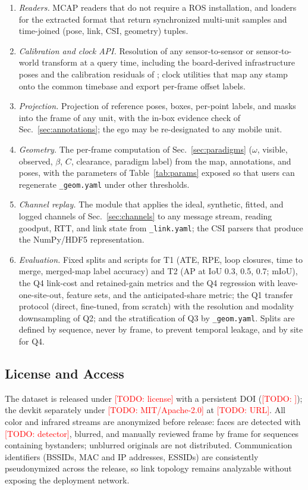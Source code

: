 \documentclass[journal]{IEEEtran}
\newcommand{\todo}[1]{\textcolor{red}{[TODO: #1]}}
\begin{document}
\begin{enumerate}
\item \emph{Readers.} MCAP readers that do not require a ROS
installation, and loaders for the extracted format that return
synchronized multi-unit samples and time-joined (pose, link, CSI,
geometry) tuples.
\item \emph{Calibration and clock API.} Resolution of any
sensor-to-sensor or sensor-to-world transform at a query time,
including the board-derived infrastructure poses and the calibration
residuals of \cite{scoop_testbed}; clock utilities that map any stamp
onto the common timebase and export per-frame offset labels.
\item \emph{Projection.} Projection of reference poses, boxes,
per-point labels, and masks into the frame of any unit, with the
in-box evidence check of Sec.~\ref{sec:annotations}; the ego may be
re-designated to any mobile unit.
\item \emph{Geometry.} The per-frame computation of
Sec.~\ref{sec:paradigms} ($\omega$, visible, observed, $\beta$, $C$,
clearance, paradigm label) from the map, annotations, and poses, with
the parameters of Table~\ref{tab:params} exposed so that users can
regenerate \texttt{\_geom.yaml} under other thresholds.
\item \emph{Channel replay.} The module that applies the ideal,
synthetic, fitted, and logged channels of Sec.~\ref{sec:channels} to any
message stream, reading goodput, RTT, and link state from
\texttt{\_link.yaml}; the CSI parsers that produce the NumPy/HDF5
representation.
\item \emph{Evaluation.} Fixed splits and scripts for T1 (ATE, RPE,
loop closures, time to merge, merged-map label accuracy) and T2 (AP
at IoU 0.3, 0.5, 0.7; mIoU), the Q4 link-cost and retained-gain
metrics and the Q4 regression with leave-one-site-out, feature sets,
and the anticipated-share metric; the Q1 transfer protocol (direct,
fine-tuned, from scratch) with the resolution and modality
downsampling of Q2; and the stratification of Q3 by
\texttt{\_geom.yaml}. Splits are defined by sequence, never by frame,
to prevent temporal leakage, and by site for Q4.
\end{enumerate}

\subsection{License and Access}
The dataset is released under \todo{license} with a persistent DOI
(\todo{}); the devkit separately under \todo{MIT/Apache-2.0} at
\todo{URL}. All color and infrared streams are anonymized before
release: faces are detected with \todo{detector}, blurred, and
manually reviewed frame by frame for sequences containing bystanders;
unblurred originals are not distributed. Communication identifiers
(BSSIDs, MAC and IP addresses, ESSIDs) are consistently pseudonymized
across the release, so link topology remains analyzable without
exposing the deployment network.
\end{document}
